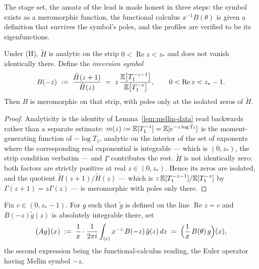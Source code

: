 The stage set, the ansatz of the lead is made honest in three steps: the symbol exists
as a meromorphic function, the functional calculus $x^{-1}B(\theta)$ is given a
definition that survives the symbol's poles, and the profiles are verified to be its
eigenfunctions.

\begin{lemma}\label{lem:inversion-symbol}
Under (H), $\tilde H$ is analytic on the strip $0 < \operatorname{Re} z < z_*$ and does not
vanish identically there. Define the \emph{inversion symbol}
\[
  B(-z) \;:=\; \frac{\tilde H(z+1)}{\tilde H(z)}
  \;=\; z\,\frac{\mathbb{E}\bigl[T_1^{-z-1}\bigr]}{\mathbb{E}\bigl[T_1^{-z}\bigr]},
  \qquad 0 < \operatorname{Re} z < z_* - 1 .
\]
Then $B$ is meromorphic on that strip, with poles only at the isolated zeros of $\tilde H$.
\end{lemma}

\begin{proof}
Analyticity is the identity of Lemma~\ref{lem:mellin-data} read backwards rather than a
separate estimate: $m(z) := \mathbb{E}[T_1^{-z}] = \mathbb{E}[e^{-z\log T_1}]$ is the moment-generating
function of $-\log T_1$, analytic on the interior of the set of exponents where the
corresponding real exponential is integrable --- which is $(0, z_*)$, the strip condition
verbatim --- and $\Gamma$ contributes the rest. $\tilde H$ is not identically zero: both
factors are strictly positive at real $z \in (0, z_*)$. Hence its zeros are isolated, and the
quotient $\tilde H(z+1)/\tilde H(z)$ --- which is $z\,\mathbb{E}[T_1^{-z-1}]/\mathbb{E}[T_1^{-z}]$ by
$\Gamma(z+1) = z\Gamma(z)$ --- is meromorphic with poles only there.
\end{proof}

\begin{definition}\label{def:inversion-operator}
Fix $c \in (0, z_* - 1)$. For $g$ such that $\tilde g$ is defined on the line
$\operatorname{Re} z = c$ and $B(-z)\tilde g(z)$ is absolutely integrable there, set
\[
  \bigl(A g\bigr)(x) \;:=\; \frac{1}{x}\cdot \frac{1}{2\pi i}\int_{(c)} x^{-z}\, B(-z)\,\tilde g(z)\,dz
  \;=\; \Bigl(\frac{1}{x}\,B(\theta)\,g\Bigr)(x),
\]
the second expression being the functional-calculus reading, the Euler operator having Mellin
symbol $-z$.
\end{definition}

